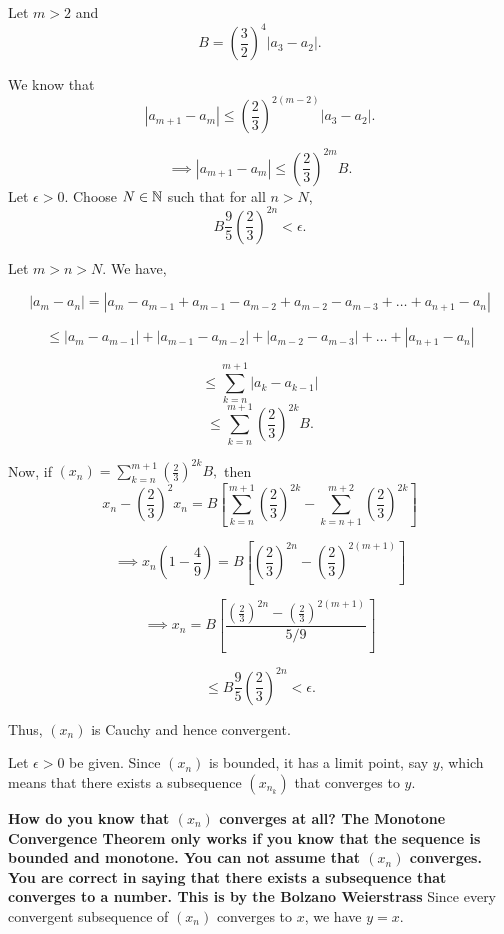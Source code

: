 \documentclass{report}
\begin{document}
\begin{myproof}

Let $m>2$ and $$B =\left(\frac{3}{2}\right)^{4}\left|a_3 -a_2\right|.$$

We know that  
$$ \left|a_{m+1} - a_m\right| \leq \left(\frac{2}{3}\right)^{2(m-2)} \left|a_3 -a_2\right|.$$

$$ \implies \left|a_{m+1} - a_m\right| \leq \left(\frac{2}{3}\right)^{2m}B.$$
Let $\epsilon > 0.$ Choose $N\in\NN$ such that for all $n > N$, $$ B \frac{9}{5}\left(\frac{2}{3}\right)^{2n}< \epsilon.$$

Let $m > n > N.$ We have,

$$|a_m - a_n|= |a_m - a_{m-1} + a_{m-1} - a_{m-2}  + a_{m-2} - a_{m-3}+ \dots+ a_{n+1} -  a_{n}| $$

$$\leq |a_m - a_{m-1}| + |a_{m-1} - a_{m-2}|  + 
|a_{m-2} -  a_{m-3}| + \dots + | a_{n+1} -  a_{n}| $$

$$ \leq \sum_{k={n}}^{m+1} |a_k - a_{k-1}|$$
$$ \leq \sum_{k={n}}^{m+1} \left(\frac{2}{3}\right)^{2k}B  .$$


Now, if $(x_n)= \sum_{k={n}}^{m+1} \left(\frac{2}{3}\right)^{2k}B , $ then
$$x_n - \left(\frac{2}{3}\right)^2x_n = B\left[\sum_{k={n}}^{m+1}\left(\frac{2}{3}\right)^{2k} - \sum_{k={n+1}}^{m+2}\left(\frac{2}{3}\right)^{2k}\right]$$

$$\implies x_n\left(1 - \frac{4}{9}\right) = B\left[ \left(\frac{2}{3}\right)^{2n}- \left(\frac{2}{3}\right)^{2(m+1)}\right] $$

$$\implies x_n = B\left[\frac{\left(\frac{2}{3}\right)^{2n}- \left(\frac{2}{3}\right)^{2(m+1)}}{5/9}\right] $$

$$\leq B \frac{9}{5}\left(\frac{2}{3}\right)^{2n} < \epsilon.$$


Thus, $(x_n)$ is Cauchy and hence convergent.

    
\end{myproof}

Let $\epsilon>0$ be given. Since $\left(x_n\right)$ is bounded, it has a limit point, say $y$, which means that there exists a subsequence $\left(x_{n_k}\right)$ that converges to $y$. 

\textbf{
How do you know that $(x_n)$ converges at all? The Monotone Convergence Theorem only works if you know that the sequence is bounded and monotone. You can not assume that $(x_n)$ converges. You are correct in saying that there exists a subsequence that converges to a number. This is by the Bolzano Weierstrass
}
Since every convergent subsequence of $\left(x_n\right)$ converges to $x$, we have $y=x$.
\end{document}
